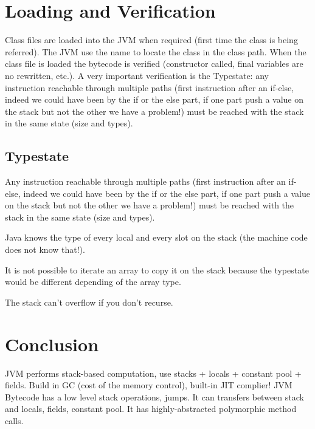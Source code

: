 \section{Loading and Verification}
Class files are loaded into the JVM when required (first time the class is being
referred). The JVM use the name to locate the class in the class path. When the
class file is loaded the bytecode is verified (constructor called, final
variables are no rewritten, etc.). A very important verification is the
Typestate: any instruction reachable through multiple paths (first instruction
after an if-else, indeed we could have been by the if or the else part, if one
part push a value on the stack but not the other we have a problem!) must be
reached with the stack in the same state (size and types).
\subsection{Typestate}
    \theoremstyle{definition}
    \begin{definition}[name]
        Any instruction reachable through multiple paths (first instruction
after an if-else, indeed we could have been by the if or the else part, if one
part push a value on the stack but not the other we have a problem!) must be
reached with the stack in the same state (size and types).
    \end{definition}

    Java knows the type of every local and every slot on the stack (the machine
    code does not know that!). 

    It is not possible to iterate an array to copy it on the stack because the
    typestate would be different depending of the array type.

    The stack can't overflow if you don't recurse.

\section{Conclusion}
    JVM performs stack-based computation, use stacks + locals + constant pool +
    fields. Build in GC (cost of the memory control), built-in JIT complier! JVM
    Bytecode has a low level stack operations, jumps. It can transfers between
    stack and locals, fields, constant pool. It has highly-abstracted
    polymorphic method calls.